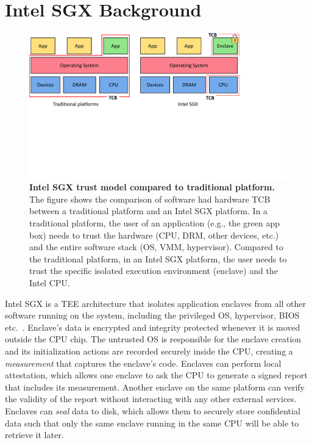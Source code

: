 \section{Intel SGX Background}
\label{ch:background:SGX}

\begin{figure}[t]
  \centering
    \includegraphics[trim={0 9cm 5cm 0},clip,width=\linewidth]{chapters/background/figures/SGX_trust.pdf}
    \caption[Intel SGX trust model compared to traditional platform]{\textbf{Intel SGX trust model compared to traditional platform.} The figure shows the comparison of software had hardware TCB between a traditional platform and an Intel SGX platform. In a traditional platform, the user of an application (e.g., the green app box) needs to trust the hardware (CPU, DRM, other devices, etc.) and the entire software stack (OS, VMM, hypervisor). Compared to the traditional platform, in an Intel SGX platform, the user needs to trust the specific isolated execution environment (enclave) and the Intel CPU.}
    \label{fig:sgx_trust_bg}
\end{figure}




Intel SGX is a TEE architecture that isolates application enclaves from all other software running on the system, including the privileged OS, hypervisor, BIOS etc.~\cite{sgxexplained}. Enclave's data is encrypted and integrity protected whenever it is moved outside the CPU chip. The untrusted OS is responsible for the enclave creation and its initialization actions are recorded securely inside the CPU, creating a \emph{measurement} that captures the enclave's code. Enclaves can perform local attestation, which allows one enclave to ask the CPU to generate a signed report that includes its measurement. Another enclave on the same platform can verify the validity of the report without interacting with any other external services. Enclaves can \emph{seal} data to disk, which allows them to securely store confidential data such that only the same enclave running in the same CPU will be able to retrieve it later.



